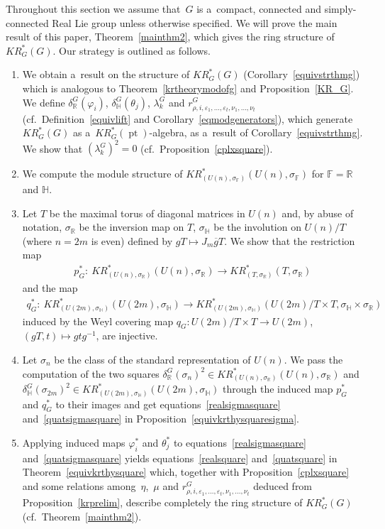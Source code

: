 \documentclass[11pt]{article}
\numberwithin{equation}{section}
\DeclareMathOperator{\pt}{pt}
\begin{document}
Throughout this section we assume that~$G$ is a~compact, connected and simply-connected Real Lie group unless otherwise
specif\/ied.
We will prove the main result of this paper, Theorem~\ref{mainthm2}, which gives the ring structure of $KR_G^*(G)$.
Our strategy is outlined as follows.
\begin{enumerate}\itemsep=0pt
\item
We obtain a~result on the structure of $KR^*_G(G)$ (Corollary~\ref{equivstrthmg}) which is analogous to
Theorem~\ref{krtheorymodofg} and Proposition~\ref{KR_G}.
We def\/ine $\delta_\mathbb{R}^G(\varphi_i)$, $\delta_\mathbb{H}^G(\theta_j)$, $\lambda_k^G$ and $r^G_{\rho, i,
\varepsilon_1, \dots, \varepsilon_t, \nu_1, \dots, \nu_t}$ (cf.\ Def\/inition~\ref{equivlift} and
Corollary~\ref{eqmodgenerators}), which generate $KR_G^*(G)$ as a~$KR_G^*(\pt)$-algebra, as a~result of
Corollary~\ref{equivstrthmg}.
We show that $(\lambda_k^G)^2=0$ (cf.\ Proposition~\ref{cplxsquare}).
\item
We compute the module structure of $KR^*_{(U(n),
\sigma_\mathbb{F})}(U(n),
\sigma_\mathbb{F})$ for $\mathbb{F}=\mathbb{R}$ and $\mathbb{H}$.
\item
Let $T$ be the maximal torus of diagonal matrices in $U(n)$ and, by abuse of notation, $\sigma_\mathbb{R}$ be the inversion map on $T$, $\sigma_\mathbb{H}$ be the involution on $U(n)/T$ (where $n=2m$ is even) def\/ined by $gT\mapsto J_m\overline{g}T$.
We show that the restriction map
\begin{gather*}
p^*_G: \  KR^*_{(U(n),
\sigma_\mathbb{R})}(U(n),
\sigma_\mathbb{R})\to KR^*_{(T,
\sigma_\mathbb{R})}(T,
\sigma_\mathbb{R})
\end{gather*}
and the map
\begin{gather*}
q^*_G: \ KR^*_{(U(2m),
\sigma_\mathbb{H})}(U(2m),
\sigma_\mathbb{H})\to KR^*_{(U(2m),
\sigma_\mathbb{H})}(U(2m)/T\times T,
\sigma_\mathbb{H}
\times
\sigma_\mathbb{R})
\end{gather*}
induced by the Weyl covering map $q_G: U(2m)/T\times T\to U(2m)$, $(gT, t)\mapsto gtg^{-1}$, are injective.
\item
Let $\sigma_n$ be the class of the standard representation of $U(n)$.
We pass the computation of the two squares $\delta_\mathbb{R}^G(\sigma_n)^2\in KR^*_{(U(n), \sigma_\mathbb{R})}(U(n),
\sigma_\mathbb{R})$ and $\delta_\mathbb{H}^G(\sigma_{2m})^2\in KR^*_{(U(2m),
\sigma_\mathbb{H})}(U(2m),
\sigma_\mathbb{H})$ through the induced map $p^*_G$ and $q_G^*$ to their images and get equations~\eqref{realsigmasquare}
and~\eqref{quatsigmasquare} in Proposition~\ref{equivkrthysquaresigma}.
\item
Applying induced maps $\varphi_i^*$ and $\theta_j^*$ to equations~\eqref{realsigmasquare} and~\eqref{quatsigmasquare}
yields equations~\eqref{realsquare} and~\eqref{quatsquare} in Theorem~\ref{equivkrthysquare} which, together with
Proposition~\ref{cplxsquare} and some relations among~$\eta$,~$\mu$ and $r^G_{\rho, i, \varepsilon_1, \dots,
\varepsilon_t, \nu_1, \dots, \nu_t}$ deduced from Proposition~\ref{krprelim}, describe completely the ring structure of
$KR_G^*(G)$ (cf.\ Theorem~\ref{mainthm2}).
\end{enumerate}
\end{document}
